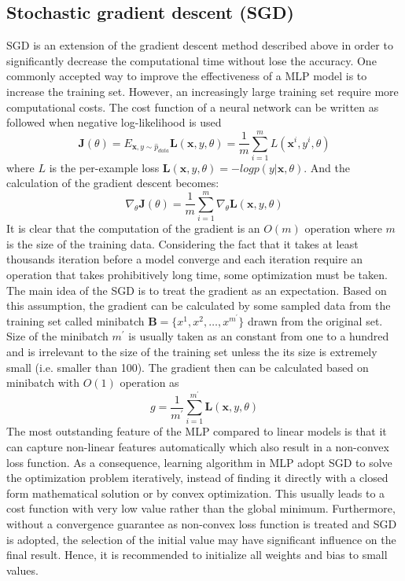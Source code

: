 \subsection{Stochastic gradient descent (SGD)}
\label{lr_sec:ml_sgd}
SGD is an extension of the gradient descent method described above in order to significantly decrease the computational time without lose the accuracy.
One commonly accepted way to improve the effectiveness of a MLP model is to increase the training set.
However, an increasingly large training set require more computational costs.
The cost function of a neural network can be written as followed when negative log-likelihood is used
\begin{equation}
    \mathbf{J}(\theta) = E_{\mathbf{x},y\sim\hat{p}_{data}}\mathbf{L}(\mathbf{x},y,\theta)
    =\frac{1}{m}\sum^m_{i=1}L(\mathbf{x}^{i},y^{i},\theta)
\end{equation}
%
where $L$ is the per-example loss $\mathbf{L}(\mathbf{x},y,\theta)=-log p(y|\mathbf{x},\theta)$.
And the calculation of the gradient descent becomes:
\begin{equation}
    \nabla_{\theta} \mathbf{J}(\theta)
    =\frac{1}{m}\sum^m_{i=1}\nabla_\theta \mathbf{L} (\mathbf{x},y,\theta)
\end{equation}
%
It is clear that the computation of the gradient is an $O(m)$ operation where $m$ is the size of the training data.
Considering the fact that it takes at least thousands iteration before a model converge and each iteration require an operation that takes prohibitively long time, some optimization must be taken.
The main idea of the SGD is to treat the gradient as an expectation.
Based on this assumption, the gradient can be calculated by some sampled data from the training set called minibatch $\mathbf{B}=\{x^{1},x^{2},\dots,x^{m^\prime}\}$ drawn from the original set.
Size of the minibatch $m^\prime$ is usually taken as an constant from one to a hundred and is irrelevant to the size of the training set unless the its size is extremely small (i.e. smaller than 100).
The gradient then can be calculated based on minibatch with $O(1)$ operation as
\begin{equation}
    g
    =\frac{1}{m^\prime} \sum^{m^\prime}_{i=1} \mathbf{L} (\mathbf{x},y,\theta)
\end{equation}
%
The most outstanding feature of the MLP compared to linear models is that it can capture non-linear features automatically which also result in a non-convex loss function.
As a consequence, learning algorithm in MLP adopt SGD to solve the optimization problem iteratively, instead of finding it directly with a closed form mathematical solution or by convex optimization.
This usually leads to a cost function with very low value rather than the global minimum.
Furthermore, without a convergence guarantee as non-convex loss function is treated and SGD is adopted, the selection of the initial value may have significant influence on the final result.
Hence, it is recommended to initialize all weights and bias to small values.

